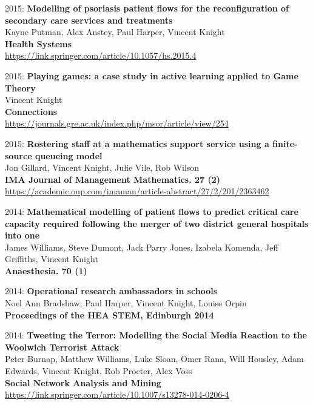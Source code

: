 \documentclass[10pt]{article}
\begin{document}
\begin{etaremune}
\item
  2015: \textbf{Modelling of psoriasis patient flows for the reconfiguration of secondary care services and treatments}\\
  Kayne Putman, Alex Anstey, Paul Harper, Vincent Knight\\
  \textbf{Health Systems}\\
  \url{https://link.springer.com/article/10.1057/hs.2015.4}\\
  

\item
  2015: \textbf{Playing games: a case study in active learning applied to Game Theory}\\
  Vincent Knight\\
  \textbf{Connections}\\
  \url{https://journals.gre.ac.uk/index.php/msor/article/view/254}\\
  

\item
  2015: \textbf{Rostering staff at a mathematics support service using a finite-source queueing model}\\
  Jon Gillard, Vincent Knight, Julie Vile, Rob Wilson\\
  \textbf{IMA Journal of Management Mathematics. 27 (2)}\\
  \url{https://academic.oup.com/imaman/article-abstract/27/2/201/2363462}\\
  

\item
  2014: \textbf{Mathematical modelling of patient flows to predict critical care capacity required following the merger of two district general hospitals into one}\\
  James Williams, Steve Dumont, Jack Parry Jones, Izabela Komenda, Jeff Griffiths, Vincent Knight\\
  \textbf{Anaesthesia. 70 (1)}\\
  
  

\item
  2014: \textbf{Operational research ambassadors in schools}\\
  Noel Ann Bradshaw, Paul Harper, Vincent Knight, Louise Orpin\\
  \textbf{Proceedings of the HEA STEM, Edinburgh 2014}\\
  
  

\item
  2014: \textbf{Tweeting the Terror: Modelling the Social Media Reaction to the Woolwich Terrorist Attack}\\
  Peter Burnap, Matthew Williams, Luke Sloan, Omer Rana, Will Housley, Adam Edwards, Vincent Knight, Rob Procter, Alex Voss\\
  \textbf{Social Network Analysis and Mining}\\
  \url{https://link.springer.com/article/10.1007/s13278-014-0206-4}\\
  


\end{etaremune}
\end{document}

